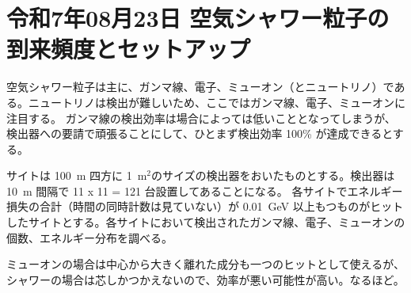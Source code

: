 
\section{令和7年08月23日 空気シャワー粒子の到来頻度とセットアップ}
\label{sec:diary-20250823}

空気シャワー粒子は主に、ガンマ線、電子、ミューオン（とニュートリノ）である。ニュートリノは検出が難しいため、ここではガンマ線、電子、ミューオンに注目する。
ガンマ線の検出効率は場合によっては低いこととなってしまうが、検出器への要請で頑張ることにして、ひとまず検出効率 100\% が達成できるとする。

サイトは 100~m 四方に 1~m$^2$のサイズの検出器をおいたものとする。検出器は 10~m 間隔で 11 x 11 = 121 台設置してあることになる。
各サイトでエネルギー損失の合計（時間の同時計数は見ていない）が 0.01~GeV 以上もつものがヒットしたサイトとする。各サイトにおいて検出されたガンマ線、電子、ミューオンの個数、エネルギー分布を調べる。


ミューオンの場合は中心から大きく離れた成分も一つのヒットとして使えるが、シャワーの場合は芯しかつかえないので、効率が悪い可能性が高い。なるほど。